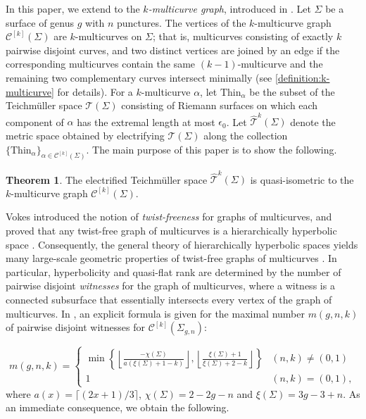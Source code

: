 \documentclass[a4paper,11pt]{amsart}
\numberwithin{equation}{section}
\theoremstyle{definition}
\newtheorem{theorema}{Theorem}
\newcommand{\Teich}{\mathcal{T}}
\newcommand{\elTeich}{\hat{\mathcal{T}}}
\newcommand{\Thin}{\mathrm{Thin}}
\newcommand{\multicurve}[1]{\mathcal{C}^{[#1]}}
\begin{document}
In this paper, we extend \cite[Theorem~1.2]{masur1999complex} to the \emph{$k$-multicurve graph}, introduced in \cite{erlandsson2017multicurve}.
Let $\Sigma$ be a surface of genus $g$ with $n$ punctures.
The vertices of the $k$-multicurve graph $\multicurve{k}(\Sigma)$ are $k$-multicurves on $\Sigma$; that is, multicurves consisting of exactly $k$ pairwise disjoint curves, and two distinct vertices are joined by an edge if the corresponding multicurves contain the same $(k-1)$-multicurve and the remaining two complementary curves intersect  minimally (see \cref{definition:k-multicurve} for details).
For a $k$-multicurve $\alpha$, let $\Thin_\alpha$ be the subset of the Teichmüller space $\Teich(\Sigma)$ consisting of Riemann surfaces on which each component of $\alpha$ has the extremal length at most $\epsilon_0$.
Let $\elTeich^{k}(\Sigma)$ denote the metric space obtained by electrifying $\Teich(\Sigma)$ along the collection $\{\Thin_\alpha\}_{\alpha\in \multicurve{k}(\Sigma)}$.
The main purpose of this paper is to show the following.
\begin{theorema}\label{theoremA}
The electrified Teichmüller space $\elTeich^{k}(\Sigma)$ is quasi-isometric to the $k$-multicurve graph $\multicurve{k}(\Sigma)$.
\end{theorema}

Vokes introduced the notion of \emph{twist-freeness} for graphs of multicurves, and proved that any twist-free graph of multicurves is a hierarchically hyperbolic space \cite{vokes2022hirarchical}. 
Consequently, the general theory of hierarchically hyperbolic spaces \cite{behrstock2017hierarchyI,behrstock2019hierarchyII} yields many large-scale geometric properties of twist-free graphs of multicurves \cite{vokes2022hirarchical,russel2022thickness}. 
In particular, hyperbolicity and quasi-flat rank are determined by the number of pairwise disjoint \emph{witnesses} for the graph of multicurves, where a witness is a connected subsurface that essentially intersects every vertex of the graph of multicurves.
In \cite{kuno2026interpolating}, an explicit formula is given for the maximal number $m(g,n,k)$ of pairwise disjoint witnesses for $\multicurve{k}(\Sigma_{g,n})$:

\begin{equation*}
    m(g,n,k)=
        \begin{cases}
            \min \left\{\left\lfloor \frac{-\chi(\Sigma)}{a(\xi(\Sigma)+1-k)}\right\rfloor, \left\lfloor \frac{\xi(\Sigma)+1}{\xi(\Sigma)+2-k}\right\rfloor \right\} & (n,k)\neq (0,1) \\
            1 & (n,k)=(0,1),
        \end{cases}
\end{equation*}
where $a(x)= \lceil (2x+1)/3 \rceil$, $\chi(\Sigma)=2-2g-n$ and $\xi(\Sigma)=3g-3+n$.
As an immediate consequence, we obtain the following.
\end{document}
